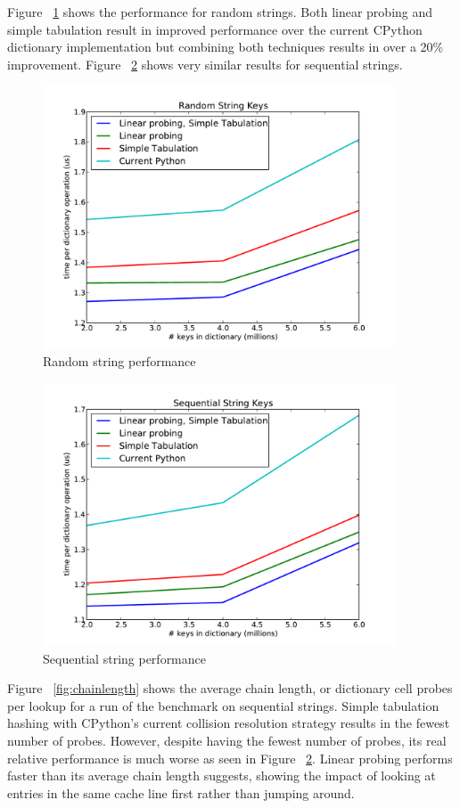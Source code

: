 \documentclass[11pt]{article}
\begin{document}
Figure ~\ref{fig:randstring} shows the performance for random strings.  Both
linear probing and simple tabulation result in improved performance over the
current CPython dictionary implementation but combining both techniques results
in over a 20\% improvement.  Figure ~\ref{fig:seqstring} shows very similar
results for sequential strings.

\begin{figure}[H]
  \centering
  \includegraphics[width=4.1in]{randstring.pdf}
  \caption{Random string performance}
  \label{fig:randstring}
\end{figure}
\begin{figure}[H]
  \centering
  \includegraphics[width=4.1in]{seqstring.pdf}
  \caption{Sequential string performance}
  \label{fig:seqstring}
\end{figure}

Figure ~\ref{fig:chainlength} shows the average chain length, or dictionary
cell probes per lookup for a run of the benchmark on sequential strings.
Simple tabulation hashing with CPython's current collision resolution strategy
results in the fewest number of probes.  However, despite having the fewest
number of probes, its real relative performance is much worse as seen in Figure
~\ref{fig:seqstring}.  Linear probing performs faster than its average
chain length suggests, showing the impact of looking at entries in the same
cache line first rather than jumping around.
\end{document}
